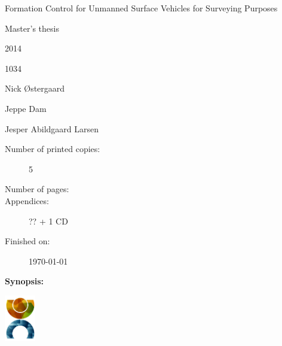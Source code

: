 \begin{minipage}[c]{0.45\textwidth}
	\begin{description}[leftmargin=\parindent+0.5em,labelindent=\parindent]
	\item [\textbf{Title:}] \tightlist
	\item Formation Control for Unmanned Surface Vehicles for Surveying Purposes
	\end{description}

	\begin{description}
	\item [\textbf{Theme:}] \tightlist
	\item Master’s thesis
	\end{description}

	\begin{description}
	\item[Projectperiod:] \tightlist
	\item 2014
	\end{description}
	\begin{description}
	\item[Projectgroup:] \tightlist
	\item 1034
	\end{description}

	\begin{description}
	\item[Participants:] \tightlist
	\item Nick \O stergaard 
	\item Jeppe Dam
	\end{description} 

	\begin{description}
	\item[Supervisor:] \tightlist
	\item Jesper Abildgaard Larsen
	\end{description}

	\begin{description}
	\item[Number of printed copies:] 5
	\item[Number of pages:] \arabic{lastsheet} 
	\item[Appendices:] ?? + 1 CD
	\item[Finished on:] \today
	\end{description}
\end{minipage}
\hfill
\begin{minipage}[r]{0.50\textwidth}
	{\textbf{Synopsis:}} \\
	\fbox{\parbox[c]{\textwidth-0.5em}{
	\bigskip
	{\vfill{\small 
	\bigskip}}
    }}
\end{minipage}
\vfill
\begin{center}
	\includegraphics[width=1.35cm]{frontmatter/ca-logo.pdf}
\end{center}


